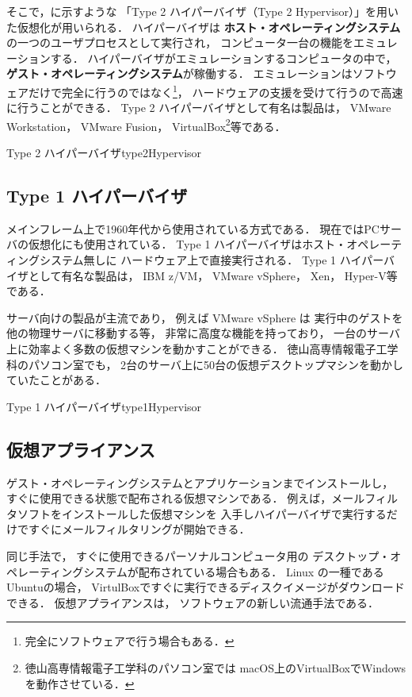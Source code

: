 そこで，に示すような
「Type 2 ハイパーバイザ（Type 2 Hypervisor）」を用いた仮想化が用いられる．
ハイパーバイザは
{\bf ホスト・オペレーティングシステム}の一つのユーザプロセスとして実行され，
コンピュータ一台の機能をエミュレーションする．
ハイパーバイザがエミュレーションするコンピュータの中で，
{\bf ゲスト・オペレーティングシステム}が稼働する．
エミュレーションはソフトウェアだけで完全に行うのではなく\footnote{
完全にソフトウェアで行う場合もある．}，
ハードウェアの支援を受けて行うので高速に行うことができる\cite{virtualization}．
Type 2 ハイパーバイザとして有名は製品は，
VMware Workstation，
VMware Fusion，
VirtualBox\footnote{
徳山高専情報電子工学科のパソコン室では
macOS上のVirtualBoxでWindowsを動作させている．
}等である．

{Type 2 ハイパーバイザ}{type2Hypervisor}

\subsection{Type 1 ハイパーバイザ}
メインフレーム上で1960年代から使用されている方式である．
現在ではPCサーバの仮想化にも使用されている．
Type 1 ハイパーバイザはホスト・オペレーティングシステム無しに
ハードウェア上で直接実行される．
Type 1 ハイパーバイザとして有名な製品は，
IBM z/VM，
VMware vSphere，
Xen，
Hyper-V等である．

サーバ向けの製品が主流であり，
例えば VMware vSphere は
実行中のゲストを他の物理サーバに移動する等，
非常に高度な機能を持っており\cite{vsphere}，
一台のサーバ上に効率よく多数の仮想マシンを動かすことができる．
徳山高専情報電子工学科のパソコン室でも，
2台のサーバ上に50台の仮想デスクトップマシンを動かしていたことがある．

{Type 1 ハイパーバイザ}{type1Hypervisor}

\subsection{仮想アプライアンス}
ゲスト・オペレーティングシステムとアプリケーションまでインストールし，
すぐに使用できる状態で配布される仮想マシンである．
例えば，メールフィルタソフトをインストールした仮想マシンを
入手しハイパーバイザで実行するだけですぐにメールフィルタリングが開始できる．

同じ手法で，
すぐに使用できるパーソナルコンピュータ用の
デスクトップ・オペレーティングシステムが配布されている場合もある．
Linux の一種であるUbuntuの場合，
VirtulBoxですぐに実行できるディスクイメージがダウンロードできる\cite{ubuntu}．
仮想アプライアンスは，
ソフトウェアの新しい流通手法である．

